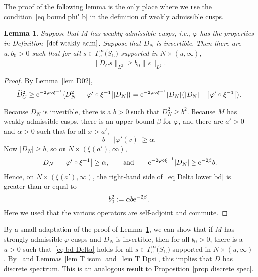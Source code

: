 \documentclass[pdftex]{sigma}%
\numberwithin{equation}{section}
\newtheorem{Lemma}[Theorem]{Lemma}
\begin{document}
The proof of the following lemma is the only place where we use the condition~\eqref{eq bound phi' b} in the definition of weakly admissible cusps.
\begin{Lemma}\label{lem bd Delta}
Suppose that $M$ has weakly admissible cusps, i.e., $\varphi$ has the properties in Definition~$\ref{def weakly adm}$.
Suppose that $D_N$ is invertible. Then there are $u,b_0>0$ such that for all $s \in \Gamma_c^{\infty}\big(\widetilde{S}_C)$ supported in $N \times (u,\infty)$,
\begin{equation} \label{eq bd Delta}
\big\| \widetilde{D}_C s \big\|_{L^2} \geq b_0 \|s \|_{L^2}.
\end{equation}
\end{Lemma}
\begin{proof}
By Lemma~\ref{lem D02},
\begin{equation} \label{eq Delta lower bd}
\widetilde{D}_C^2 \geq {\rm e}^{-2 \varphi \circ \xi^{-1}} \big(D_N^2 - \big|\varphi' \circ \xi^{-1}\big| |D_N|\big)
= {\rm e}^{-2 \varphi \circ \xi^{-1}} |D_N| \bigl( |D_N| - \big|\varphi' \circ \xi^{-1}\big| \bigr).
\end{equation}

Because $D_N$ is invertible, there is a $b>0$ such that $D_N^2\geq b^2$. Because $M$ has weakly admissible cusps, there is an upper bound $\beta$ for $\varphi$, and there are
 $a'>0$ and $\alpha>0$ such that for all $x>a'$,
\[
 b-|\varphi'(x)|\geq \alpha.
\]
Now $|D_N| \geq b$, so on $N \times (\xi(a'), \infty)$,
\[
 |D_N| - \big|\varphi' \circ \xi^{-1}\big|\geq \alpha, \qquad \text{and}\qquad
{\rm e}^{-2 \varphi \circ \xi^{-1}} |D_N| \geq {\rm e}^{-2\beta} b.
\]
Hence, on $N \times (\xi(a'), \infty)$, the right-hand side of~\eqref{eq Delta lower bd} is greater than or equal to
\[
b_0^2 := \alpha b{\rm e}^{-2\beta}.
\]
Here we used that the various operators are self-adjoint and commute.
\end{proof}

\begin{Remark}
By a small adaptation of the proof of Lemma~\ref{lem bd Delta}, we can show that if $M$ has strongly admissible $\varphi$-cusps and $D_N$ is invertible, then for all $b_0>0$, there is a $u>0$ such that~\eqref{eq bd Delta} holds
 for all $s \in \Gamma_c^{\infty}\big(\widetilde{S}_C\big)$ supported in $N \times (u,\infty)$. By~\cite[Theorem~SD]{Anghel16} and Lemmas~\ref{lem T isom} and~\ref{lem T Dpsi}, this implies that $D$ has discrete spectrum. This is an analogous result to Proposition~\ref{prop discrete spec}.
\end{Remark}
\end{document}
